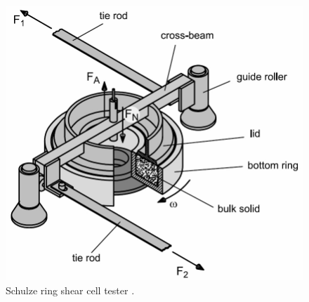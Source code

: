 \begin{figure}[!htb]
\centering
\includegraphics[width=.80\columnwidth]{images/001srsct}
\caption[Schulze ring shear cell tester]{Schulze ring shear cell tester
\cite{RefWorks:69}.}
\label{fig:001srsct}
\end{figure}